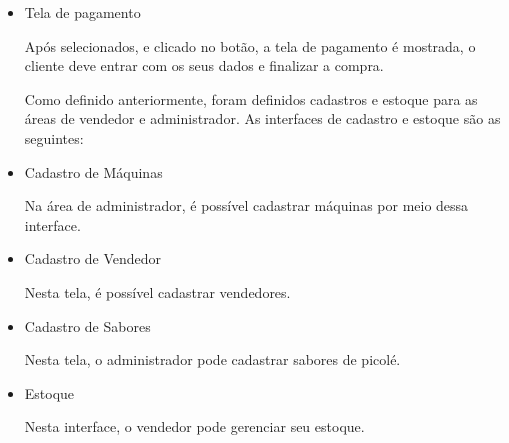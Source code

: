 \begin{itemize}
\item{Tela de pagamento}


Após selecionados, e clicado no botão, a tela de pagamento é mostrada, o cliente deve entrar com os seus dados e finalizar a compra.

Como definido anteriormente, foram definidos cadastros e estoque para as áreas de vendedor e administrador. As interfaces de cadastro e estoque são as seguintes:

\item{Cadastro de Máquinas}


Na área de administrador, é possível cadastrar máquinas por meio dessa interface.

\item{Cadastro de Vendedor}


Nesta tela, é possível cadastrar vendedores.

\item{Cadastro de Sabores}


Nesta tela, o administrador pode cadastrar sabores de picolé.

\item{Estoque}


Nesta interface, o vendedor pode gerenciar seu estoque.

\end{itemize}

